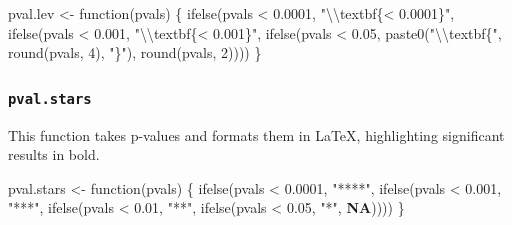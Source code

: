 \documentclass[
  bookmarksnumbered]{article}
\newenvironment{Shaded}{\begin{snugshade}}{\end{snugshade}}
\newcommand{\ConstantTok}[1]{\textcolor[rgb]{0.86,0.64,0.64}{\textbf{#1}}}
\newcommand{\ControlFlowTok}[1]{\textcolor[rgb]{0.94,0.87,0.69}{#1}}
\newcommand{\DecValTok}[1]{\textcolor[rgb]{0.86,0.86,0.80}{#1}}
\newcommand{\FloatTok}[1]{\textcolor[rgb]{0.75,0.75,0.82}{#1}}
\newcommand{\FunctionTok}[1]{\textcolor[rgb]{0.94,0.94,0.56}{#1}}
\newcommand{\NormalTok}[1]{\textcolor[rgb]{0.80,0.80,0.80}{#1}}
\newcommand{\OtherTok}[1]{\textcolor[rgb]{0.94,0.94,0.56}{#1}}
\newcommand{\SpecialCharTok}[1]{\textcolor[rgb]{0.86,0.64,0.64}{#1}}
\newcommand{\StringTok}[1]{\textcolor[rgb]{0.80,0.58,0.58}{#1}}
\begin{document}
\begin{Shaded}
\begin{Highlighting}[]
\NormalTok{pval.lev }\OtherTok{\textless{}{-}} \ControlFlowTok{function}\NormalTok{(pvals) \{}
  \FunctionTok{ifelse}\NormalTok{(pvals }\SpecialCharTok{\textless{}} \FloatTok{0.0001}\NormalTok{,}
         \StringTok{"}\SpecialCharTok{\textbackslash{}\textbackslash{}}\StringTok{textbf\{\textless{} 0.0001\}"}\NormalTok{,}
         \FunctionTok{ifelse}\NormalTok{(pvals }\SpecialCharTok{\textless{}} \FloatTok{0.001}\NormalTok{,}
                \StringTok{"}\SpecialCharTok{\textbackslash{}\textbackslash{}}\StringTok{textbf\{\textless{} 0.001\}"}\NormalTok{,}
                \FunctionTok{ifelse}\NormalTok{(pvals }\SpecialCharTok{\textless{}} \FloatTok{0.05}\NormalTok{,}
                       \FunctionTok{paste0}\NormalTok{(}\StringTok{"}\SpecialCharTok{\textbackslash{}\textbackslash{}}\StringTok{textbf\{"}\NormalTok{, }\FunctionTok{round}\NormalTok{(pvals, }\DecValTok{4}\NormalTok{), }\StringTok{"\}"}\NormalTok{),}
                       \FunctionTok{round}\NormalTok{(pvals, }\DecValTok{2}\NormalTok{))))}
\NormalTok{\}}
\end{Highlighting}
\end{Shaded}

\hypertarget{pval.stars}{%
\subsubsection{\texorpdfstring{\texttt{pval.stars}}{pval.stars}}\label{pval.stars}}

This function takes p-values and formats them in \LaTeX, highlighting significant results in bold.

\begin{Shaded}
\begin{Highlighting}[]
\NormalTok{pval.stars }\OtherTok{\textless{}{-}} \ControlFlowTok{function}\NormalTok{(pvals) \{}
  \FunctionTok{ifelse}\NormalTok{(pvals }\SpecialCharTok{\textless{}} \FloatTok{0.0001}\NormalTok{,}
         \StringTok{"****"}\NormalTok{,}
         \FunctionTok{ifelse}\NormalTok{(pvals }\SpecialCharTok{\textless{}} \FloatTok{0.001}\NormalTok{,}
                \StringTok{"***"}\NormalTok{,}
                \FunctionTok{ifelse}\NormalTok{(pvals }\SpecialCharTok{\textless{}} \FloatTok{0.01}\NormalTok{,}
                \StringTok{"**"}\NormalTok{,}
                       \FunctionTok{ifelse}\NormalTok{(pvals }\SpecialCharTok{\textless{}} \FloatTok{0.05}\NormalTok{,}
                       \StringTok{"*"}\NormalTok{, }\ConstantTok{NA}\NormalTok{))))}
\NormalTok{\}}
\end{Highlighting}
\end{Shaded}
\end{document}
